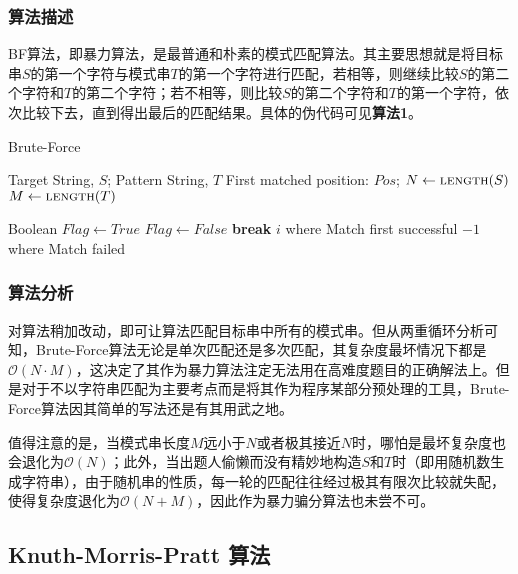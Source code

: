 \documentclass[UTF8]{ctexart}
\begin{document}
\subsubsection {算法描述}

BF算法，即暴力算法，是最普通和朴素的模式匹配算法。其主要思想就是将目标串$S$的第一个字符与模式串$T$的第一个字符进行匹配，若相等，则继续比较$S$的第二个字符和$T$的第二个字符；若不相等，则比较$S$的第二个字符和$T$的第一个字符，依次比较下去，直到得出最后的匹配结果。具体的伪代码可见\textbf{算法1}。

\begin{algorithm}
\caption{Brute-Force}  
\label{alg:Brute-Force}  
\begin{algorithmic} [1]
    \Require  
      Target String, $S$;
	  Pattern String, $T$
    \Ensure  
      First matched position: $Pos$;  
		\State $N \gets \Call{length}{S}$
		\State $M \gets \Call{length}{T}$  
		
			\State Boolean $Flag \gets True$
					\State $Flag \gets False$
					\State \textbf{break}
				\EndIf
			\EndFor
				\State \Return $i$ where Match first successful
			\EndIf
		\EndFor
	\State \Return $-1$ where Match failed
	\EndFunction  
\end{algorithmic}
\end{algorithm}

\subsubsection {算法分析}

对算法稍加改动，即可让算法匹配目标串中所有的模式串。但从两重循环分析可知，Brute-Force算法无论是单次匹配还是多次匹配，其复杂度最坏情况下都是$\mathcal{O}(N \cdot M)$，这决定了其作为暴力算法注定无法用在高难度题目的正确解法上。但是对于不以字符串匹配为主要考点而是将其作为程序某部分预处理的工具，Brute-Force算法因其简单的写法还是有其用武之地。 \par
值得注意的是，当模式串长度$M$远小于$N$或者极其接近$N$时，哪怕是最坏复杂度也会退化为$\mathcal{O}(N)$；此外，当出题人偷懒而没有精妙地构造$S$和$T$时（即用随机数生成字符串），由于随机串的性质，每一轮的匹配往往经过极其有限次比较就失配，使得复杂度退化为$\mathcal{O}(N+M)$，因此作为暴力骗分算法也未尝不可。

\subsection {Knuth-Morris-Pratt 算法}
\end{document}
